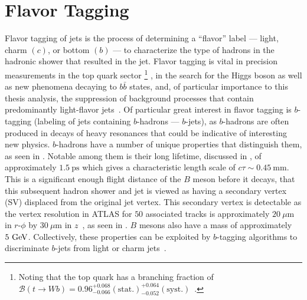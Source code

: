 \section{Flavor Tagging}\label{section:flavor_tagging}

Flavor tagging of jets is the process of determining a ``flavor'' label --- light, charm $(c)$, or bottom $(b)$ --- to characterize the type of hadrons in the hadronic shower that resulted in the jet.
Flavor tagging is vital in precision measurements in the top quark sector%
\footnote{Noting that the top quark has a branching fraction of $\mathcal{B}\left(t \to W b\right) = 0.96_{-0.066}^{+0.068}\left(\mathrm{stat.}\right)_{-0.052}^{+0.064}\left(\mathrm{syst.}\right)$~\cite{Abazov:2010tm,PhysRevD.98.030001}.}%
, in the search for the Higgs boson as well as new phenomena decaying to $b\bar{b}$ states, and, of particular importance to this thesis analysis, the suppression of background processes that contain predominantly light-flavor jets~\cite{PERF-2012-04}.
Of particular great interest in flavor tagging is $b$-tagging (labeling of jets containing $b$-hadrons --- $b$-jets), as $b$-hadrons are often produced in decays of heavy resonances that could be indicative of interesting new physics.
$b$-hadrons have a number of unique properties that distinguish them, as seen in .
Notable among them is their long lifetime, discussed in , of approximately $1.5~\mathrm{ps}$ which gives a characteristic length scale of $c\tau \sim 0.45~\mathrm{mm}$.
This is a significant enough flight distance of the $B$ meson before it decays, that this subsequent hadron shower and jet is viewed as having a secondary vertex (SV) displaced from the original jet vertex.
This secondary vertex is detectable as the vertex resolution in ATLAS for $50$ associated tracks is approximately $20~\mu\mathrm{m}$ in $r$-$\phi$ by $30~\mu\mathrm{m}$ in $z$~\cite{Choi:2271033,ATL-PHYS-PUB-2015-026}, as seen in .
$B$ mesons also have a mass of approximately $5~\mathrm{GeV}$.
Collectively, these properties can be exploited by $b$-tagging algorithms to discriminate $b$-jets from light or charm jets~\cite{ATL-PHYS-PUB-2015-022,ATL-PHYS-PUB-2016-012,ATL-PHYS-PUB-2017-013,PERF-2016-05}.

